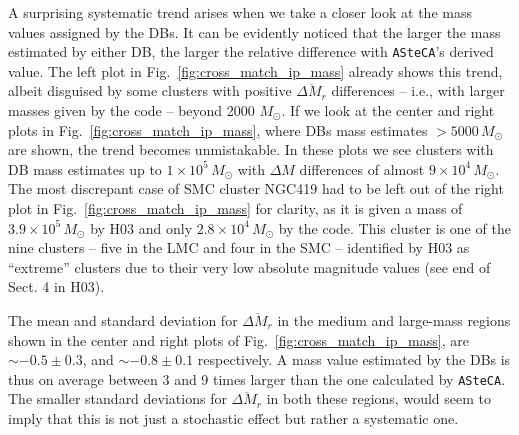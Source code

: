 \documentclass{aa}
\begin{document}
A surprising systematic trend arises when we take a closer look at the mass
values assigned by the DBs. It can be evidently noticed that the larger the
mass estimated by either DB, the larger the relative difference with 
\texttt{ASteCA}'s derived value. The left plot in
Fig.~\ref{fig:cross_match_ip_mass} already shows this trend, albeit disguised by
some clusters with positive $\overline{\Delta M_r}$ differences --
i.e., with larger masses given by the code -- beyond 2000 $M_{\odot}$.
%
If we look at the center and right plots in Fig.~\ref{fig:cross_match_ip_mass},
where DBs mass estimates ${>}5000\,M_{\odot}$ are shown, the trend becomes
unmistakable.
In these plots we see clusters with DB mass estimates up to $1{\times}10^5\,M_{\odot}$
with $\Delta M$ differences of almost $9{\times}10^4\,M_{\odot}$.
The most discrepant case of SMC cluster NGC419 had to be left out of the right
plot in Fig.~\ref{fig:cross_match_ip_mass} for clarity, as it is given a mass of
$3.9{\times}10^5\,M_{\odot}$ by H03 and only $2.8{\times}10^4\,M_{\odot}$ by the
code. This cluster is one of the nine clusters -- five in the LMC and four in the SMC
-- identified by H03 as ``extreme'' clusters due to their very low absolute
magnitude values (see end of Sect. 4 in H03).

The mean and standard deviation for $\overline{\Delta M_r}$ in the medium and
large-mass regions shown in the center and right plots of
Fig.~\ref{fig:cross_match_ip_mass}, are ${\sim-}0.5{\pm}0.3$,
and ${\sim-}0.8{\pm}0.1$ respectively.
A mass value estimated by the DBs is thus on average between 3 and 9 times
larger than the one calculated by \texttt{ASteCA}.
The smaller standard deviations for $\overline{\Delta M_r}$ in both these
regions, would seem to imply that this is not just a stochastic effect but
rather a systematic one.
\end{document}
